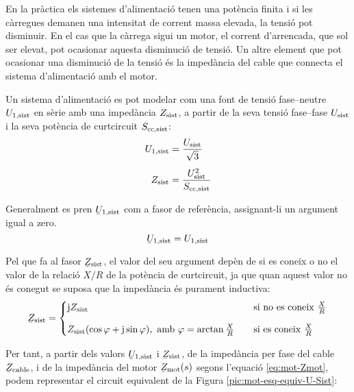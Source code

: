 En la pràctica els sistemes d'alimentació tenen una potència finita i si les càrregues demanen una intensitat de corrent massa elevada, la tensió pot disminuir. En el cas que la càrrega sigui un motor, el corrent d'arrencada, que sol ser elevat, pot ocasionar aquesta disminució de tensió. Un altre element que pot ocasionar una disminució de la tensió és la impedància del cable que connecta el sistema d'alimentació amb el motor.

Un sistema d'alimentació es pot modelar com una font de tensió fase--neutre $U_\mathrm{1,sist}$ en sèrie amb una impedància $Z_\mathrm{sist}$, a partir de la seva tensió fase--fase $U_\mathrm{sist}$ i la seva potència de curtcircuit $S_\mathrm{cc,sist}$:
\begin{align}
	U_\mathrm{1,sist} &= \frac{U_\mathrm{sist}}{\sqrt{3}} \\[1ex]
	Z_\mathrm{sist} &= \frac{U_\mathrm{sist}^2}{S_\mathrm{cc,sist}}
\end{align}

Generalment es pren $\cmplx{U}\ped{1,sist}$ com a fasor de referència, assignant-li un argument igual a zero. 
\begin{equation}
	\cmplx{U}\ped{1,sist} = U\ped{1,sist}
\end{equation}

Pel que fa al fasor  $\cmplx{Z}\ped{sist}$, el valor del seu argument depèn de si es coneix o no el valor de la relació $X/R$ de la potència de curtcircuit, ja que quan aquest valor no és conegut se suposa que la impedància és purament inductiva:
\begin{equation}
	\cmplx{Z}\ped{sist} = 
	\begin{cases}
		\ju Z\ped{sist}  & \quad\text{si no es coneix }\frac{X}{R}  \\[2ex]
		Z\ped{sist} (\cos\varphi+\ju\sin\varphi), \text{ amb } \varphi=\arctan\frac{X}{R}& \quad\text{si es coneix } \frac{X}{R} 
	\end{cases}
\end{equation}

Per tant, a partir dels valors $\cmplx{U}\ped{1,sist}$ i $\cmplx{Z}\ped{sist}$, de la impedància per fase del cable $\cmplx{Z}\ped{cable}$, i de la impedància del motor $\cmplx{Z}\ped{mot}(s)$ segons l'equació \eqref{eq:mot-Zmot}, podem representar el circuit equivalent de la Figura \vref{pic:mot-esq-equiv-U-Sist}:
\begin{center}
	
	\label{pic:mot-esq-equiv-U-Sist}
\end{center}

